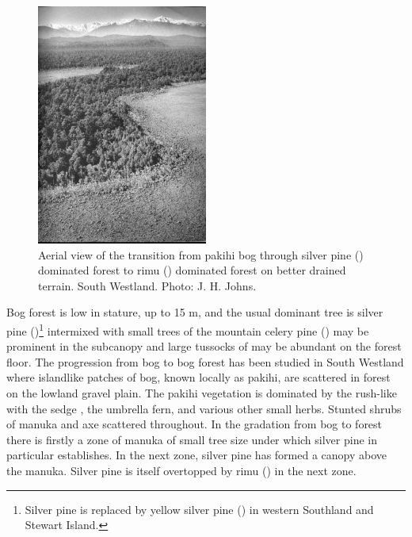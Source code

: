 \begin{figure}
	\includegraphics[width=0.5\textwidth]{graphics/figure68transition.jpg}
	\centering
	\caption[Aerial view of the transition from pakihi bog through silver pine to rimu]{Aerial view of the transition from pakihi bog through silver pine () dominated forest to rimu () dominated forest on better drained terrain.
South Westland.
	Photo: J. H. Johns.}%
	\label{fig:68transition}
\end{figure}

Bog forest is low in stature, up to 15 m, and the usual dominant tree is silver pine ()\footnote{Silver pine is replaced by yellow silver pine () in western Southland and Stewart Island.} intermixed with small trees of the mountain celery pine () may be prominent in the subcanopy and large tussocks of  may be abundant on the forest floor.
The progression from bog to bog forest has been studied in South Westland where islandlike patches of bog, known locally as pakihi, are scattered in forest on the lowland gravel plain.
The pakihi vegetation is dominated by the rush-like  with the sedge , the umbrella fern,  and various other small herbs.
Stunted shrubs of manuka and  axe scattered throughout.
In the gradation from bog to forest there is firstly a zone of manuka of small tree size under which silver pine in particular establishes.
In the next zone, silver pine has formed a canopy above the manuka.
Silver pine is itself overtopped by rimu () in the next zone.

